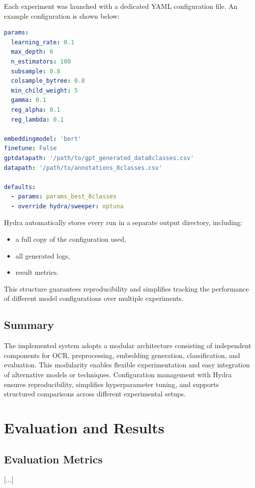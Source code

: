 \documentclass{SGGW-thesis-EN}
\begin{document}
Each experiment was launched with a dedicated YAML configuration file. An example configuration is shown below:

\begin{lstlisting}[language=yaml, caption=Sample Hydra configuration]
params:
  learning_rate: 0.1
  max_depth: 6
  n_estimators: 100
  subsample: 0.8
  colsample_bytree: 0.8
  min_child_weight: 5
  gamma: 0.1
  reg_alpha: 0.1
  reg_lambda: 0.1

embeddingmodel: 'bert'
finetune: False
gptdatapath: '/path/to/gpt_generated_data8classes.csv'
datapath: '/path/to/annotations_8classes.csv'

defaults:
  - params: params_best_8classes
  - override hydra/sweeper: optuna
\end{lstlisting}

Hydra automatically stores every run in a separate output directory, including:
\begin{itemize}
  \item a full copy of the configuration used,
  \item all generated logs,
  \item result metrics.
\end{itemize}

This structure guarantees reproducibility and simplifies tracking the performance of different model configurations over multiple experiments.

\section{Summary}

The implemented system adopts a modular architecture consisting of independent components for OCR, preprocessing,
embedding generation, classification, and evaluation. This modularity enables flexible experimentation and easy
integration of alternative models or techniques. Configuration management with Hydra ensures reproducibility,
simplifies hyperparameter tuning, and supports structured comparisons across different experimental setups.

\chapter{Evaluation and Results}

\section{Evaluation Metrics}
[...]
\end{document}

